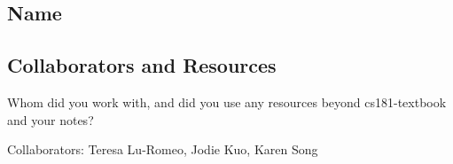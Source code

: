 \documentclass[submit]{harvardml}
\begin{document}
\newpage
\subsection*{Name}

\subsection*{Collaborators and Resources}
Whom did you work with, and did you use any resources beyond cs181-textbook and your notes?

Collaborators: Teresa Lu-Romeo, Jodie Kuo, Karen Song
\end{document}

